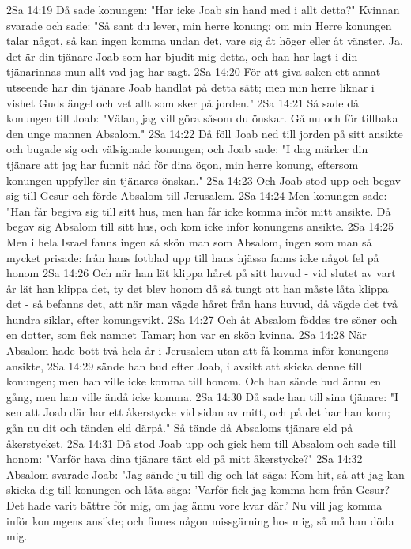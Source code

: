 2Sa 14:19  Då sade konungen: "Har icke Joab sin hand med i allt detta?" Kvinnan svarade och sade: "Så sant du lever, min herre konung: om min Herre konungen talar något, så kan ingen komma undan det, vare sig åt höger eller åt vänster. Ja, det är din tjänare Joab som har bjudit mig detta, och han har lagt i din tjänarinnas mun allt vad jag har sagt.
2Sa 14:20  För att giva saken ett annat utseende har din tjänare Joab handlat på detta sätt; men min herre liknar i vishet Guds ängel och vet allt som sker på jorden."
2Sa 14:21  Så sade då konungen till Joab: "Välan, jag vill göra såsom du önskar. Gå nu och för tillbaka den unge mannen Absalom."
2Sa 14:22  Då föll Joab ned till jorden på sitt ansikte och bugade sig och välsignade konungen; och Joab sade: "I dag märker din tjänare att jag har funnit nåd för dina ögon, min herre konung, eftersom konungen uppfyller sin tjänares önskan."
2Sa 14:23  Och Joab stod upp och begav sig till Gesur och förde Absalom till Jerusalem.
2Sa 14:24  Men konungen sade: "Han får begiva sig till sitt hus, men han får icke komma inför mitt ansikte. Då begav sig Absalom till sitt hus, och kom icke inför konungens ansikte.
2Sa 14:25  Men i hela Israel fanns ingen så skön man som Absalom, ingen som man så mycket prisade: från hans fotblad upp till hans hjässa fanns icke något fel på honom
2Sa 14:26  Och när han lät klippa håret på sitt huvud - vid slutet av vart år lät han klippa det, ty det blev honom då så tungt att han måste låta klippa det - så befanns det, att när man vägde håret från hans huvud, då vägde det två hundra siklar, efter konungsvikt.
2Sa 14:27  Och åt Absalom föddes tre söner och en dotter, som fick namnet Tamar; hon var en skön kvinna.
2Sa 14:28  När Absalom hade bott två hela år i Jerusalem utan att få komma inför konungens ansikte,
2Sa 14:29  sände han bud efter Joab, i avsikt att skicka denne till konungen; men han ville icke komma till honom. Och han sände bud ännu en gång, men han ville ändå icke komma.
2Sa 14:30  Då sade han till sina tjänare: "I sen att Joab där har ett åkerstycke vid sidan av mitt, och på det har han korn; gån nu dit och tänden eld därpå." Så tände då Absaloms tjänare eld på åkerstycket.
2Sa 14:31  Då stod Joab upp och gick hem till Absalom och sade till honom: "Varför hava dina tjänare tänt eld på mitt åkerstycke?"
2Sa 14:32  Absalom svarade Joab: "Jag sände ju till dig och lät säga: Kom hit, så att jag kan skicka dig till konungen och låta säga: 'Varför fick jag komma hem från Gesur? Det hade varit bättre för mig, om jag ännu vore kvar där.' Nu vill jag komma inför konungens ansikte; och finnes någon missgärning hos mig, så må han döda mig.
